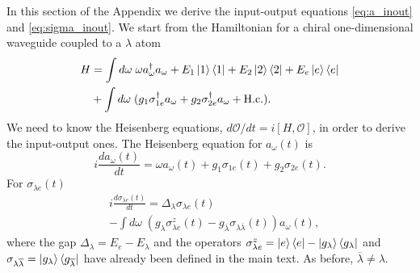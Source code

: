\documentclass[aps,pra,reprint,amsmath,amssymb]{revtex4-1}
\begin{document}
In this section of the Appendix we derive the input-output equations \eqref{eq:a_inout} and \eqref{eq:sigma_inout}. We start from the Hamiltonian for a chiral one-dimensional waveguide coupled to a $\lambda$ atom
\begin{align}
H & = \int d\omega \; \omega a_\omega^\dagger a_\omega + E_1\ket{1}\bra{1} + E_2\ket{2}\bra{2} + E_e\ket{e}\bra{e}\nonumber\\
& + \int d\omega\; (g_1\sigma_{1e}^\dagger a_\omega + g_2 \sigma_{2e}^\dagger a_\omega + \text{H.c.}).
\end{align}
We need to know the Heisenberg equations, $d\mathcal{O}/dt=i[H,\mathcal{O}]$, in order to derive the input-output ones. The Heisenberg equation for $a_\omega(t)$ is
\begin{equation}\label{eq:aw_Heisenberg}
i\frac{d a_\omega(t)}{dt}=\omega a_\omega(t) + g_1 \sigma_{1e}(t) + g_2 \sigma_{2e}(t).
\end{equation}
For $\sigma_{\lambda e}(t)$
\begin{align}\label{eq:sigma_Heisenberg}
&i\frac{d\sigma_{\lambda e}(t)}{dt}=\Delta_\lambda \sigma_{\lambda e}(t)\nonumber\\
&-\int d\omega\; (g_\lambda \sigma_{\lambda e}^z(t)-g_{\overline{\lambda}} \sigma_{\lambda\overline{\lambda}}(t))a_\omega(t),
\end{align}
where the gap $\Delta_\lambda=E_e-E_\lambda$ and the operators $\sigma_{\lambda e}^z=\ket{e}\bra{e}-\ket{g_\lambda}\bra{g_\lambda}$ and $\sigma_{\lambda\overline{\lambda}}=\ket{g_\lambda}\bra{g_{\overline{\lambda}}}$ have already been defined in the main text. As before, $\overline{\lambda}\neq \lambda$.
\end{document}
